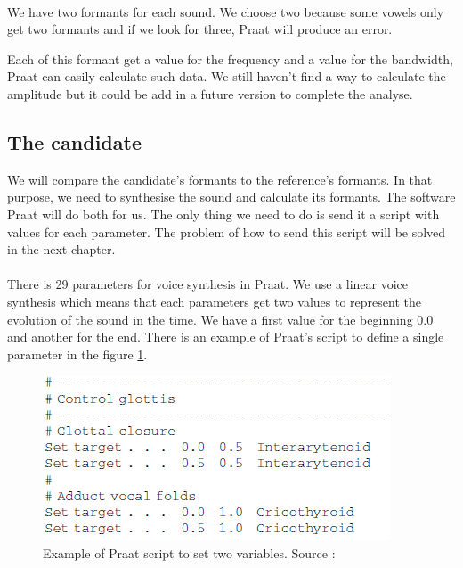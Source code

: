 \documentclass[12pt]{report}
\begin{document}
\paragraph*{}
We have two formants for each sound. We choose two because some vowels only get two formants and if we look for three, Praat will produce an error.

Each of this formant get a value for the frequency and a value for the bandwidth, Praat can easily calculate such data. We still haven't find a way to calculate the amplitude but it could be add in a future version to complete the analyse.

\subsection{The candidate}
We will compare the candidate's formants to the reference's formants. In that purpose, we need to synthesise the sound and calculate its formants. The software Praat\cite{ref1} will do both for us. The only thing we need to do is send it a script with values for each parameter. The problem of how to send this script will be solved in the next chapter.

\paragraph*{}
There is 29 parameters for voice synthesis in Praat. We use a linear voice synthesis which means that each parameters get two values to represent the evolution of the sound in the time.  We have a first value for the beginning 0.0 and another for the end. There is an example of Praat's script to define a single parameter in the figure \ref{praatScript}.

\begin{figure}[h]
\begin{center}
\includegraphics{resources/praatScript.png} 
\end{center}
\caption{Example of Praat script to set two variables. Source : \cite{ref5}}
\label{praatScript}
\end{figure}
\end{document}
